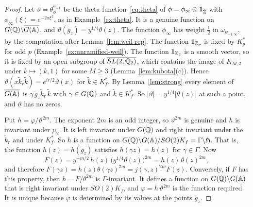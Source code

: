 \begin{proof}
Let $\vartheta=\theta^{\psi_{-1}}_{\phi}$ be the theta
function~\eqref{eq:theta} of $\phi=\phi_\infty\otimes\mathbf 1_{\hat{\mathbb{Z}}}$
with $\phi_\infty(\xi)=e^{-2\pi\xi^2}$, as in Example~\ref{ex:theta}. It
is a genuine function on $G(\mathbb{Q})\backslash\overline{G(\mathbb{A})}$, and
$\vartheta(\tilde g_z)=y^{1/4}\theta(z)$. The function $\phi_\infty$ has
weight $\frac12$ in $\omega_{\psi_{-1,\infty}}$, by the computation after
Lemma~\ref{lem:weil-rep}. The function $\mathbf 1_{\mathbb{Z}_p}$ is fixed by
$K_p^*$ for odd $p$ (Example~\ref{ex:unramified-weil}). The function
$\mathbf 1_{\mathbb{Z}_2}$ is a smooth vector, so it is fixed by an open subgroup
of $\overline{SL(2,\mathbb{Q}_2)}$, which contains the image of $K_{M,2}$ under
$k\mapsto(k,1)$ for some $M\ge3$ (Lemma~\ref{lem:kubota}(c)). Hence
$\vartheta(x\tilde k_r\tilde k)=e^{ir/2}\vartheta(x)$ for
$\tilde k\in K_f^*$. By Lemma~\ref{lem:strong} every element of
$\overline{G(\mathbb{A})}$ is $\gamma\,\tilde g_z\tilde k_r\,\tilde k$ with
$\gamma\in G(\mathbb{Q})$ and $\tilde k\in K_f^*$. So $|\vartheta|=y^{1/4}
|\theta(z)|$ at such a point, and $\vartheta$ has no zeros.

Put $h=\varphi/\vartheta^{2m}$. The exponent $2m$ is an odd integer, so
$\vartheta^{2m}$ is genuine and $h$ is invariant under $\mu_2$. It is
left invariant under $G(\mathbb{Q})$ and right invariant under the $\tilde
k_r$ and under $K_f^*$. So $h$ is a function on $G(\mathbb{Q})\backslash
G(\mathbb{A})/SO(2)K_f=\Gamma\backslash\mathfrak H$. That is, the function
$h(z)=h(\tilde g_z)$ satisfies $h(\gamma z)=h(z)$ for $\gamma\in\Gamma$.
Now
\[
F(z)=y^{-m/2}\,h(z)\,\bigl(y^{1/4}\theta(z)\bigr)^{2m}=h(z)\,\theta(z)^{2m},
\]
and therefore $F(\gamma z)=h(z)\theta(\gamma z)^{2m}=j(\gamma,z)^{2m}F(z)$.
Conversely, if $F$ has this property, then $h=F/\theta^{2m}$ is
$\Gamma$-invariant. It defines a function on $G(\mathbb{Q})\backslash G(\mathbb{A})$ that
is right invariant under $SO(2)K_f$, and $\varphi=h\,\vartheta^{2m}$ is
the function required. It is unique because $\varphi$ is determined by
its values at the points $\tilde g_z$.
\end{proof}

